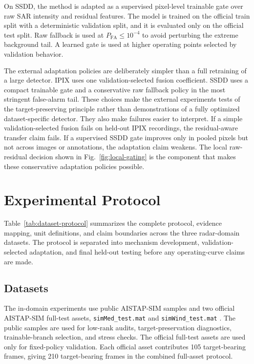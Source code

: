 \documentclass[journal]{IEEEtran}
\begin{document}
On SSDD, the method is adapted as a supervised pixel-level trainable gate over raw SAR intensity and residual features. The model is trained on the official train split with a deterministic validation split, and it is evaluated only on the official test split. Raw fallback is used at $P_{\mathrm{FA}} \leq 10^{-4}$ to avoid perturbing the extreme background tail. A learned gate is used at higher operating points selected by validation behavior.

The external adaptation policies are deliberately simpler than a full retraining of a large detector. IPIX uses one validation-selected fusion coefficient. SSDD uses a compact trainable gate and a conservative raw fallback policy in the most stringent false-alarm tail. These choices make the external experiments tests of the target-preserving principle rather than demonstrations of a fully optimized dataset-specific detector. They also make failures easier to interpret. If a simple validation-selected fusion fails on held-out IPIX recordings, the residual-aware transfer claim fails. If a supervised SSDD gate improves only in pooled pixels but not across images or annotations, the adaptation claim weakens. The local raw-residual decision shown in Fig.~\ref{fig:local-gating} is the component that makes these conservative adaptation policies possible.

\section{Experimental Protocol}

Table~\ref{tab:dataset-protocol} summarizes the complete protocol, evidence mapping, unit definitions, and claim boundaries across the three radar-domain datasets. The protocol is separated into mechanism development, validation-selected adaptation, and final held-out testing before any operating-curve claims are made.

\subsection{Datasets}

The in-domain experiments use public AISTAP-SIM samples and two official AISTAP-SIM full-test assets, \texttt{simMed\_test.mat} and \texttt{simWind\_test.mat} \cite{vega2024aistap}. The public samples are used for low-rank audits, target-preservation diagnostics, trainable-branch selection, and stress checks. The official full-test assets are used only for fixed-policy validation. Each official asset contributes 105 target-bearing frames, giving 210 target-bearing frames in the combined full-asset protocol.
\end{document}
